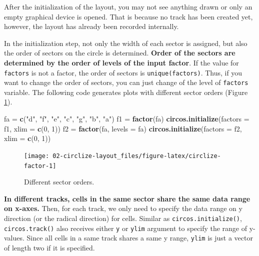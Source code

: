 \documentclass[]{book}
\newenvironment{Shaded}{\begin{snugshade}}{\end{snugshade}}
\newcommand{\KeywordTok}[1]{\textcolor[rgb]{0.13,0.29,0.53}{\textbf{#1}}}
\newcommand{\DataTypeTok}[1]{\textcolor[rgb]{0.13,0.29,0.53}{#1}}
\newcommand{\DecValTok}[1]{\textcolor[rgb]{0.00,0.00,0.81}{#1}}
\newcommand{\StringTok}[1]{\textcolor[rgb]{0.31,0.60,0.02}{#1}}
\newcommand{\NormalTok}[1]{#1}
\theoremstyle{definition}
\theoremstyle{definition}
\theoremstyle{remark}
\begin{document}
After the initialization of the layout, you may not see anything drawn
or only an empty graphical device is opened. That is because no track
has been created yet, however, the layout has already been recorded
internally.

In the initialization step, not only the width of each sector is
assigned, but also the order of sectors on the circle is determined.
\textbf{Order of the sectors are determined by the order of levels of
the input factor}. If the value for \texttt{factors} is not a factor,
the order of sectors is \texttt{unique(factors)}. Thus, if you want to
change the order of sectors, you can just change of the level of
\texttt{factors} variable. The following code generates plots with
different sector orders (Figure \ref{fig:circlize-factor}).

\begin{Shaded}
\begin{Highlighting}[]
\NormalTok{fa =}\StringTok{ }\KeywordTok{c}\NormalTok{(}\StringTok{"d"}\NormalTok{, }\StringTok{"f"}\NormalTok{, }\StringTok{"e"}\NormalTok{, }\StringTok{"c"}\NormalTok{, }\StringTok{"g"}\NormalTok{, }\StringTok{"b"}\NormalTok{, }\StringTok{"a"}\NormalTok{)}
\NormalTok{f1 =}\StringTok{ }\KeywordTok{factor}\NormalTok{(fa)}
\KeywordTok{circos.initialize}\NormalTok{(}\DataTypeTok{factors =}\NormalTok{ f1, }\DataTypeTok{xlim =} \KeywordTok{c}\NormalTok{(}\DecValTok{0}\NormalTok{, }\DecValTok{1}\NormalTok{))}
\NormalTok{f2 =}\StringTok{ }\KeywordTok{factor}\NormalTok{(fa, }\DataTypeTok{levels =}\NormalTok{ fa)}
\KeywordTok{circos.initialize}\NormalTok{(}\DataTypeTok{factors =}\NormalTok{ f2, }\DataTypeTok{xlim =} \KeywordTok{c}\NormalTok{(}\DecValTok{0}\NormalTok{, }\DecValTok{1}\NormalTok{))}
\end{Highlighting}
\end{Shaded}

\begin{figure}

{\centering \texttt{[image: 02-circlize-layout\_files/figure-latex/circlize-factor-1]} 

}

\caption{Different sector orders.}\label{fig:circlize-factor}
\end{figure}

\textbf{In different tracks, cells in the same sector share the same
data range on x-axes.} Then, for each track, we only need to specify the
data range on y direction (or the radical direction) for cells. Similar
as \texttt{circos.initialize()}, \texttt{circos.track()} also receives
either \texttt{y} or \texttt{ylim} argument to specify the range of
y-values. Since all cells in a same track shares a same y range,
\texttt{ylim} is just a vector of length two if it is specified.
\end{document}
